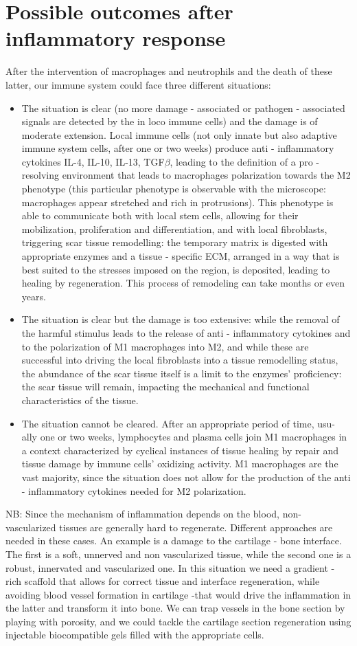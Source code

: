 \section{Possible outcomes after inflammatory response}
After the intervention of macrophages and neutrophils and the death of these latter, our immune system could face three different situations:
\begin{itemize}
\item The situation is clear (no more damage - associated or pathogen - associated signals are detected by the in loco immune cells) and the damage is of moderate extension. 
Local immune cells (not only innate but also adaptive immune system cells, after one or two weeks) produce anti - inflammatory cytokines IL-4, IL-10, IL-13, TGF$\beta$, leading to the definition of a pro - resolving environment that leads to macrophages polarization towards the M2 phenotype (this particular phenotype is observable with the microscope: macrophages appear stretched and rich in protrusions). 
This phenotype is able to communicate both with local stem cells, allowing for their mobilization, proliferation and differentiation, and with local fibroblasts, triggering scar tissue remodelling: the temporary matrix is digested with appropriate enzymes and a tissue - specific ECM, arranged in a way that is best suited to the stresses imposed on the region, is deposited, leading to healing by regeneration. This process of remodeling can take months or even years.
\item The situation is clear but the damage is too extensive: while the removal of the harmful stimulus leads to the release of anti - inflammatory cytokines and to the polarization of M1 macrophages into M2, and while these are successful into driving the local fibroblasts into a tissue remodelling status, the abundance of the scar tissue itself is a limit to the enzymes’ proficiency: the scar tissue will remain, impacting the mechanical and functional characteristics of the tissue.
\item The situation cannot be cleared. After an appropriate period of time, usu- ally one or two weeks, lymphocytes and plasma cells join M1 macrophages in a context characterized by cyclical instances of tissue healing by repair and tissue damage by immune cells’ oxidizing activity. M1 macrophages are the vast majority, since the situation does not allow for the production of the anti - inflammatory cytokines needed for M2 polarization.
\end{itemize}
\noindent
NB: Since the mechanism of inflammation depends on the blood, non-vascularized tissues are generally hard to regenerate. Different approaches are needed in these cases. An example is a damage to the cartilage - bone interface. The first is a soft, unnerved and non vascularized tissue, while the second one is a robust, innervated and vascularized one. In this situation we need a gradient - rich scaffold that allows for correct tissue and interface regeneration, while avoiding blood vessel formation in cartilage -that would drive the inflammation in the latter and transform it into bone. We can trap vessels in the bone section by playing with porosity, and we could tackle the cartilage section regeneration using injectable biocompatible gels filled with the appropriate cells.